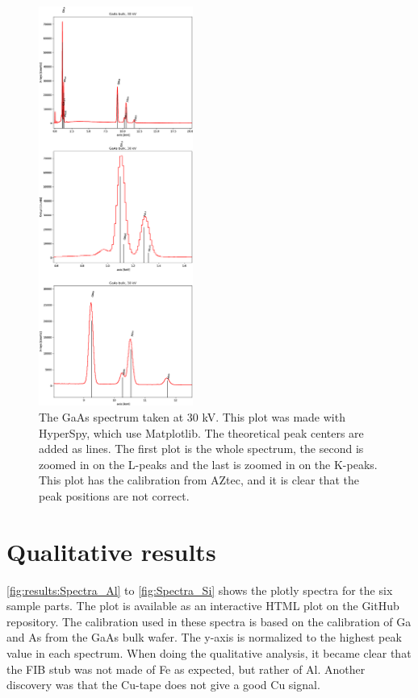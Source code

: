 \begin{figure}
    \centering
    \includegraphics[width=0.45\textwidth]{figures/GaAs30kV_HS.png}
    \caption{
        The GaAs spectrum taken at 30 kV.
        This plot was made with HyperSpy, which use Matplotlib.
        The theoretical peak centers are added as lines.
        The first plot is the whole spectrum, the second is zoomed in on the L-peaks and the last is zoomed in on the K-peaks.
        This plot has the calibration from AZtec, and it is clear that the peak positions are not correct.
    }
    \label{fig:GaAs30kV_HS}
\end{figure}



\section{Qualitative results}
\label{sec:results:qualitative}

\cref{fig:results:Spectra_Al} to \cref{fig:Spectra_Si} shows the plotly spectra for the six sample parts.
The plot is available as an interactive HTML plot on the GitHub repository.
The calibration used in these spectra is based on the calibration of Ga and As from the GaAs bulk wafer.
The y-axis is normalized to the highest peak value in each spectrum.
When doing the qualitative analysis, it became clear that the FIB stub was not made of Fe as expected, but rather of Al.
Another discovery was that the Cu-tape does not give a good Cu signal.


